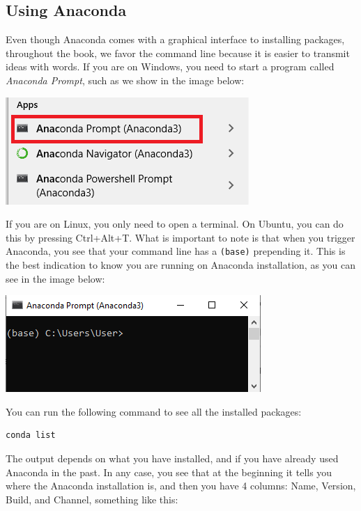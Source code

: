 \subsection{Using Anaconda}\label{subsec:using-anaconda}
Even though Anaconda comes with a graphical interface to installing packages, throughout the book, we favor the command line because it is easier to transmit ideas with words. If you are on Windows, you need to start a program called \emph{Anaconda Prompt}, such as we show in the image below:

\begin{center}
\includegraphics[width=.5\textwidth]{images/Chapter_02/AnacondaPrompt_Menu.png}
\end{center}

If you are on Linux, you only need to open a terminal. On Ubuntu, you can do this by pressing Ctrl+Alt+T. What is important to note is that when you trigger Anaconda, you see that your command line has a \texttt{(base)} prepending it. This is the best indication to know you are running on Anaconda installation, as you can see in the image below:

\begin{center}
\includegraphics[width=.5\textwidth]{images/Chapter_02/AnacondaPrompt.png}
\end{center}

You can run the following command to see all the installed packages:

\begin{verbatim}
conda list
\end{verbatim}

The output depends on what you have installed, and if you have already used Anaconda in the past. In any case, you see that at the beginning it tells you where the Anaconda installation is, and then you have 4 columns: Name, Version, Build, and Channel, something like this:

